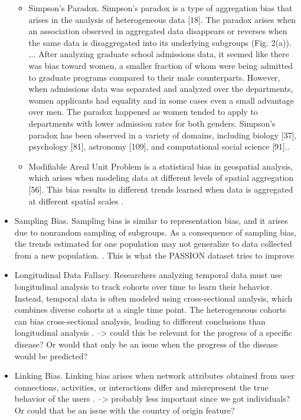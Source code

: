\documentclass[12pt, a4paper, oneside]{book}   	%
\begin{document}
\begin{itemize}
\begin{itemize}
					\item Simpson’s Paradox. Simpson’s paradox is a type of aggregation bias that arises in the analysis of heterogeneous data [18]. The paradox arises when an association observed in aggregated data disappears or reverses when the same data is disaggregated into its underlying subgroups (Fig. 2(a)). ... After analyzing graduate school admissions data, it seemed like there was bias toward women, a smaller fraction of whom were being admitted to graduate programs compared to their male counterparts. However, when admissions data was separated and analyzed over the departments, women applicants had equality and in some cases even a small advantage over men. The paradox happened as women tended to apply to departments with lower admission rates for both genders. Simpson’s paradox has been observed in a variety of domains, including biology [37], psychology [81], astronomy [109], and computational social science [91].\autocite{Mehrabi_2021}.	
					\item Modifiable Areal Unit Problem is a statistical bias in geospatial analysis, which arises when modeling data at different levels of spatial aggregation [56]. This bias results in different trends learned when data is aggregated at different spatial scales \autocite{Mehrabi_2021}.
				\end{itemize}
				\item Sampling Bias. Sampling bias is similar to representation bias, and it arises due to nonrandom sampling of subgroups. As a consequence of sampling bias, the trends estimated for one population may not generalize to data collected from a new population. \autocite{Mehrabi_2021}. This is what the PASSION dataset tries to improve
				\item Longitudinal Data Fallacy. Researchers analyzing temporal data must use longitudinal analysis to track cohorts over time to learn their behavior. Instead, temporal data is often modeled using cross-sectional analysis, which combines diverse cohorts at a single time point. The heterogeneous cohorts can bias cross-sectional analysis, leading to different conclusions than longitudinal analysis \autocite{Mehrabi_2021}. --> could this be relevant for the progress of a specific disease? Or would that only be an issue when the progress of the disease would be predicted?
				\item Linking Bias. Linking bias arises when network attributes obtained from user connections, activities, or interactions differ and misrepresent the true behavior of the users \autocite{M120_Olteanu_2019} \autocite{Mehrabi_2021}. --> probably less important since we got individuals? Or could that be an issue with the country of origin feature?
			\end{itemize}	
			
\end{document}

